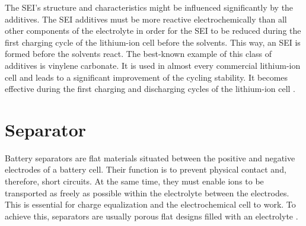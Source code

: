 The SEI's structure and characteristics might be influenced significantly by the additives. The SEI additives must be more reactive electrochemically than all other components of the electrolyte in order for the SEI to be reduced during the first charging cycle of the lithium-ion cell before the solvents. This way, an SEI is formed before the solvents react.
The best-known example of this class of additives is vinylene carbonate. It is used in almost every commercial lithium-ion cell and leads to a significant improvement of the cycling stability. It becomes effective during the first charging and discharging cycles of the lithium-ion cell \cite{xu2004nonaqueous}.

\section{Separator}
\label{sec:separator}
Battery separators are flat materials situated between the positive and negative electrodes of a battery cell. Their function is to prevent physical contact and, therefore, short circuits. At the same time, they must enable ions to be transported as freely as possible within the electrolyte between the electrodes. This is essential for charge equalization and the electrochemical cell to work. To achieve this, separators are usually porous flat designs filled with an electrolyte \cite{korthauer2018lithium}.


